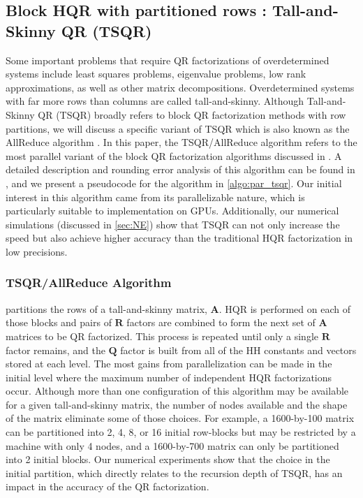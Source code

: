 \documentclass[review,onefignum,onetabnum]{siamart190516}
\newcommand{\bb}[1]{\mathbf{#1}}
\begin{document}
\subsection{Block HQR with partitioned rows : Tall-and-Skinny QR (TSQR)}\label{sec:TSQR}
Some important problems that require QR factorizations of overdetermined systems include least squares problems, eigenvalue problems, low rank approximations, as well as other matrix decompositions. 
Overdetermined systems with far more rows than columns are called tall-and-skinny.
Although Tall-and-Skinny QR (TSQR) broadly refers to block QR factorization methods with row partitions, we will discuss a specific variant of TSQR which is also known as the AllReduce algorithm \cite{Mori2012}.
In this paper, the TSQR/AllReduce algorithm refers to the most parallel variant of the block QR factorization algorithms discussed in \cite{Demmel2012}.
A detailed description and rounding error analysis of this algorithm can be found in \cite{Mori2012}, and we present a pseudocode for the algorithm in \cref{algo:par_tsqr}.
Our initial interest in this algorithm came from its parallelizable nature, which is particularly suitable to implementation on GPUs. 
Additionally, our numerical simulations (discussed in \cref{sec:NE}) show that TSQR can not only increase the speed but also achieve higher accuracy than the traditional HQR factorization in low precisions.
\subsubsection{TSQR/AllReduce Algorithm}
 partitions the rows of a tall-and-skinny matrix, $\bb{A}$. 
HQR is performed on each of those blocks and pairs of $\bb{R}$ factors are combined to form the next set of $\bb{A}$ matrices to be QR factorized. 
This process is repeated until only a single $\bb{R}$ factor remains, and the $\bb{Q}$ factor is built from all of the HH constants and vectors stored at each level.
The most gains from parallelization can be made in the initial level where the maximum number of independent HQR factorizations occur. 
Although more than one configuration of this algorithm may be available for a given tall-and-skinny matrix, the number of nodes available and the shape of the matrix eliminate some of those choices. 
For example, a 1600-by-100 matrix can be partitioned into 2, 4, 8, or 16 initial row-blocks but may be restricted by a machine with only 4 nodes, and a 1600-by-700 matrix can only be partitioned into 2 initial blocks.
Our numerical experiments show that the choice in the initial partition, which directly relates to the recursion depth of TSQR, has an impact in the accuracy of the QR factorization. \par
\end{document}
